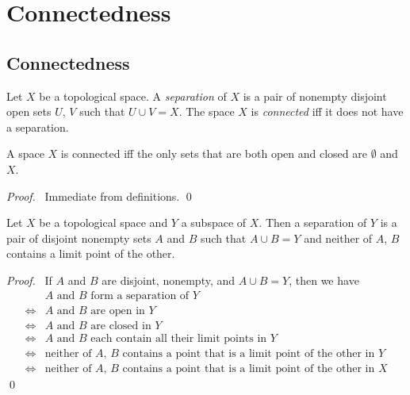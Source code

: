 \chapter{Connectedness}

\section{Connectedness}

\begin{df}[Connected]
  Let $X$ be a topological space. A \emph{separation} of $X$ is a pair of nonempty disjoint open sets $U$, $V$ such that $U \cup V = X$. The space $X$ is \emph{connected} iff it does not have a separation.
\end{df}

\begin{prop}
  A space $X$ is connected iff the only sets that are both open and closed are $\emptyset$ and $X$.
\end{prop}

\begin{proof}
  \pf\ Immediate from definitions. \qed
\end{proof}

\begin{prop}
  \label{prop:connected:subspace}
  Let $X$ be a topological space and $Y$ a subspace of $X$. Then a separation of $Y$ is a pair of disjoint nonempty sets $A$ and $B$ such that $A \cup B = Y$ and neither of $A$, $B$ contains a limit point of the other.
\end{prop}

\begin{proof}
  \pf\ If $A$ and $B$ are disjoint, nonempty, and $A \cup B = Y$, then we have
  \begin{align*}
    & \text{$A$ and $B$ form a separation of $Y$} \\
    \Leftrightarrow & \text{$A$ and $B$ are open in $Y$} \\
    \Leftrightarrow & \text{$A$ and $B$ are closed in $Y$} \\
    \Leftrightarrow & \text{$A$ and $B$ each contain all their limit points in $Y$} \\
    \Leftrightarrow & \text{neither of $A$, $B$ contains a point that is a limit point of the other in $Y$} \\
    \Leftrightarrow & \text{neither of $A$, $B$ contains a point that is a limit point of the other in $X$}
  \end{align*}
  \qed
\end{proof}

